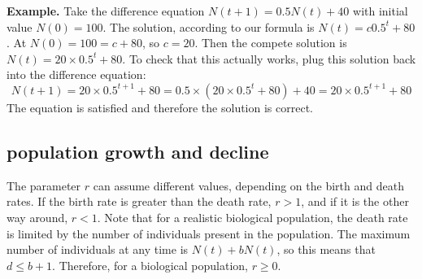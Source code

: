 \documentclass[
  letterpaper,
  DIV=11,
  numbers=noendperiod]{scrreprt}
\begin{document}
\textbf{Example.} Take the difference equation
\(N(t+1) = 0.5 N(t) + 40\) with initial value \(N(0)= 100\). The
solution, according to our formula is \(N(t) = c 0.5^t + 80\). At
\(N(0) = 100 = c+80\), so \(c=20\). Then the compete solution is
\(N(t) = 20 \times 0.5^t + 80\). To check that this actually works, plug
this solution back into the difference equation:
\[ N(t+1) = 20 \times 0.5^{t+1} + 80 = 0.5 \times (20 \times 0.5^t + 80) + 40 =  20 \times 0.5^{t+1} + 80\]
The equation is satisfied and therefore the solution is correct.

\hypertarget{population-growth-and-decline}{%
\subsection{population growth and
decline}\label{population-growth-and-decline}}

\label{sec:bio14}

The parameter \(r\) can assume different values, depending on the birth
and death rates. If the birth rate is greater than the death rate,
\(r > 1\), and if it is the other way around, \(r < 1\). Note that for a
realistic biological population, the death rate is limited by the number
of individuals present in the population. The maximum number of
individuals at any time is \(N(t)+bN(t)\), so this means that
\(d \leq b +1\). Therefore, for a biological population, \(r \geq 0\).
\end{document}
